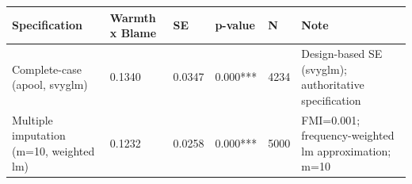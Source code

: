 
\begin{tabular}[t]{llllll}
\toprule
Specification & Warmth x Blame & SE & p-value & N & Note\\
\midrule
Complete-case (apool, svyglm) & 0.1340 & 0.0347 & 0.000*** & 4234 & Design-based SE (svyglm); authoritative specification\\
Multiple imputation (m=10, weighted lm) & 0.1232 & 0.0258 & 0.000*** & 5000 & FMI=0.001; frequency-weighted lm approximation; m=10\\
\bottomrule
\end{tabular}
